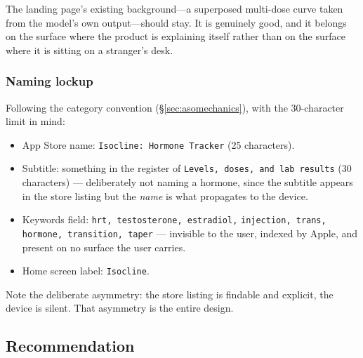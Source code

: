 \documentclass[11pt,a4paper]{article}
\newcommand{\code}[1]{\texttt{\small #1}}
\begin{document}
The landing page's existing background---a superposed multi-dose curve
taken from the model's own output---should stay. It is genuinely good,
and it belongs on the surface where the product is explaining itself
rather than on the surface where it is sitting on a stranger's desk.

\subsubsection*{Naming lockup}

Following the category convention (\S\ref{sec:asomechanics}), with the
30-character limit in mind:

\begin{itemize}[leftmargin=1.5em,itemsep=0.2em]
\item App Store name: \code{Isocline: Hormone Tracker} (25 characters).
\item Subtitle: something in the register of \code{Levels, doses, and
      lab results} (30 characters) --- deliberately not naming a
      hormone, since the subtitle appears in the store listing but the
      \emph{name} is what propagates to the device.
\item Keywords field: \code{hrt, testosterone, estradiol,}
      \code{injection, trans, hormone, transition, taper} ---
      invisible to the user, indexed by Apple, and present on no
      surface the user carries.
\item Home screen label: \code{Isocline}.
\end{itemize}

Note the deliberate asymmetry: the store listing is findable and
explicit, the device is silent. That asymmetry is the entire design.

\subsection{Recommendation}
\end{document}
